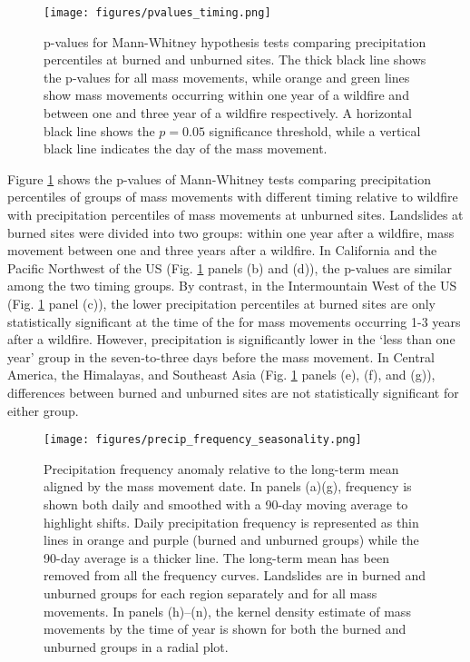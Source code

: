 \documentclass[nhess, manuscript]{copernicus}
\begin{document}
\begin{figure}
    \centering
    \texttt{[image: figures/pvalues\_timing.png]}
    \caption{p-values for Mann-Whitney hypothesis tests comparing precipitation percentiles at burned and unburned sites. The thick black line shows the p-values for all mass movements, while orange and green lines show mass movements occurring within one year of a wildfire and between one and three year of a wildfire respectively. A horizontal black line shows the $p=0.05$ significance threshold, while a vertical black line indicates the day of the mass movement.}
    \label{fig:p-timing}
\end{figure}

Figure \ref{fig:p-timing} shows the p-values of Mann-Whitney tests comparing precipitation percentiles of groups of mass movements with different timing relative to wildfire with precipitation percentiles of mass movements at unburned sites. Landslides at burned sites were divided into two groups: within one year after a wildfire, mass movement between one and three years after a wildfire. In California and the Pacific Northwest of the US (Fig. \ref{fig:p-timing} panels (b) and (d)), the p-values are similar among the two timing groups. By contrast, in the Intermountain West of the US (Fig. \ref{fig:p-timing} panel (c)), the lower precipitation percentiles at burned sites are only statistically significant at the time of the for mass movements occurring 1-3 years after a wildfire. However, precipitation is significantly lower in the ‘less than one year’ group in the seven-to-three days before the mass movement. In Central America, the Himalayas, and Southeast Asia (Fig. \ref{fig:p-timing} panels (e), (f), and (g)), differences between burned and unburned sites are not statistically significant for either group.

\begin{figure}
\centering
\texttt{[image: figures/precip\_frequency\_seasonality.png]}
\caption{Precipitation frequency anomaly relative to the long-term mean aligned by the mass movement date. In panels (a)(g), frequency is shown both daily and smoothed with a 90-day moving average to highlight shifts. Daily precipitation frequency is represented as thin lines in orange and purple (burned and unburned groups) while the 90-day average is a thicker line. The long-term mean has been removed from all the frequency curves. Landslides are in burned and unburned groups for each region separately and for all mass movements. In panels (h)--(n), the kernel density estimate of mass movements by the time of year is shown for both the burned and unburned groups in a radial plot.}
\label{fig:seasonality}
\end{figure}
\end{document}
